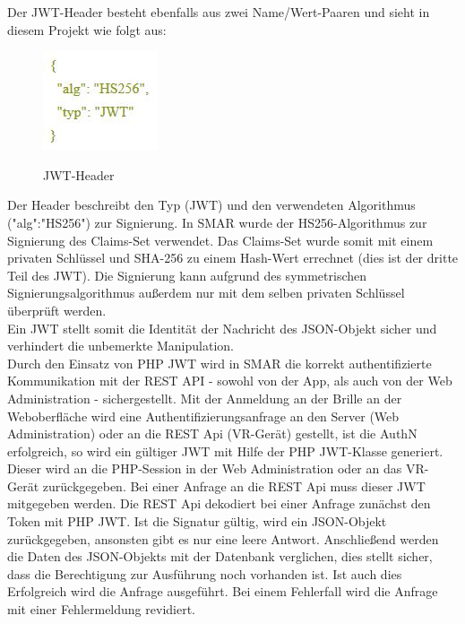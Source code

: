 Der \acs{JWT}-Header besteht ebenfalls aus zwei Name/Wert-Paaren und sieht in diesem Projekt wie folgt aus:
\begin{figure}[H]
	\centering
	{\includegraphics[scale=1.0]{Bilder/jwt_header.jpg}}
	\caption{\acs{JWT}-Header}
	\label{fig:jwt_header}
\end{figure}
Der Header beschreibt den Typ (JWT) und den verwendeten Algorithmus ("alg":"HS256") zur Signierung. In \ac{SMAR} wurde der HS256-Algorithmus zur Signierung des Claims-Set verwendet. Das Claims-Set wurde somit mit einem privaten Schlüssel und SHA-256 zu einem Hash-Wert errechnet (dies ist der dritte Teil des \acs{JWT}). Die Signierung kann aufgrund des symmetrischen Signierungsalgorithmus außerdem nur mit dem selben privaten Schlüssel überprüft werden.\\
Ein \acl{JWT} stellt somit die Identität der Nachricht \bzw des \ac{JSON}-Objekt sicher und verhindert die unbemerkte Manipulation.\\

Durch den Einsatz von PHP JWT wird in \ac{SMAR} die korrekt authentifizierte Kommunikation mit der REST API - sowohl von der App, als auch von der Web Administration - sichergestellt.
Mit der Anmeldung an der Brille \bzw an der Weboberfläche wird eine Authentifizierungsanfrage an den Server (Web Administration) oder an die REST Api (\acs{VR}-Gerät) gestellt, ist die \acl{AuthN} erfolgreich, so wird ein gültiger \ac{JWT} mit Hilfe der PHP JWT-Klasse generiert. Dieser wird an die PHP-Session in der Web Administration oder an das \acs{VR}-Gerät zurückgegeben. Bei einer Anfrage an die REST Api muss dieser \acs{JWT} mitgegeben werden. Die REST Api dekodiert bei einer Anfrage zunächst den Token mit PHP JWT. Ist die Signatur gültig, wird ein JSON-Objekt zurückgegeben, ansonsten gibt es nur eine leere Antwort. Anschließend werden die Daten des JSON-Objekts mit der Datenbank verglichen, dies stellt sicher, dass die Berechtigung zur Ausführung noch vorhanden ist. Ist auch dies Erfolgreich wird die Anfrage ausgeführt. Bei einem Fehlerfall wird die Anfrage mit einer Fehlermeldung revidiert.